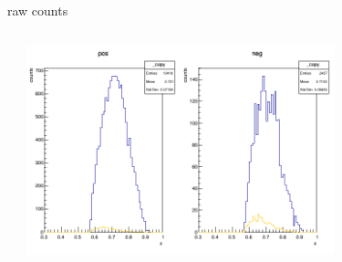 \begin{frame}{raw counts}
\begin{columns}
\begin{column}[T]{0.5\textwidth}
\end{column}
\begin{column}[T]{0.5\textwidth}
\includegraphics[width = 0.7\textwidth]{results/yield/statistics/counts_x_Q2_z_0.65_5.500_0.70.png}
\end{column}
\end{columns}
\end{frame}
